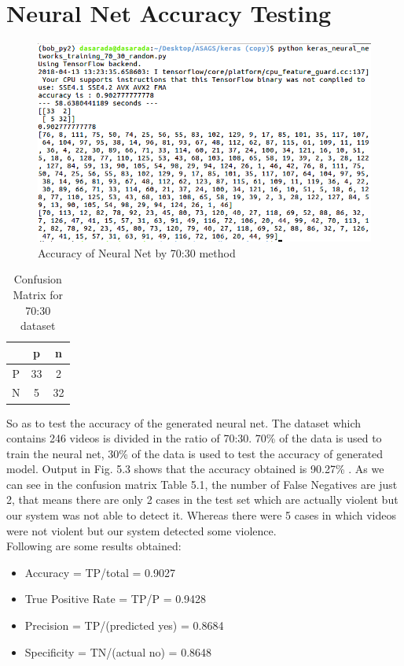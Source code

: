 \section{Neural Net Accuracy Testing}
\begin{figure}[H]
\centering
\includegraphics[width = \linewidth]{7030.png}
\caption{Accuracy of Neural Net by 70:30 method}
\end{figure}
\begin{table}[ht]
\centering
\begin{tabular}{|c|c|c|}
\hline
&p&n\\
\hline
P&33&2\\
\hline
N&5&32\\
\hline
\end{tabular}
\caption{Confusion Matrix for 70:30 dataset}
\end{table}
So as to test the accuracy of the generated neural net.
The dataset which contains 246 videos is divided in the ratio of 70:30. 70\% of the data is used to train the neural net, 30\% of the data is used to test the accuracy of generated model. Output in Fig. 5.3 shows that the accuracy obtained is 90.27\% . As we can see in the confusion matrix Table 5.1, the number of False Negatives are just 2, that means there are only 2 cases in the test set which are actually violent but our system was not able to detect it. Whereas there were 5 cases in which videos were not violent but our system detected some violence. \\
Following are some results obtained:
\begin{itemize}
	\item Accuracy = TP/total = 0.9027
	\item True Positive Rate = TP/P = 0.9428
	\item Precision = TP/(predicted yes) = 0.8684
	\item Specificity = TN/(actual no) = 0.8648
\end{itemize}
